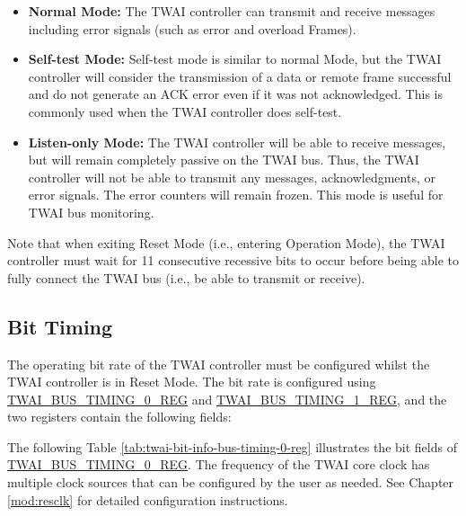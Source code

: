 \documentclass[main\_\_EN.tex]{subfiles}
\begin{document}
\begin{itemize}
    \item {\bfseries Normal Mode:} The TWAI controller can transmit and receive messages including error signals (such as error and overload Frames).
    \item {\bfseries Self-test Mode:} Self-test mode is similar to normal Mode, but the TWAI controller will consider the transmission of a data or remote frame successful and do not generate an ACK error even if it was not acknowledged. This is commonly used when the TWAI controller does self-test.
    \item {\bfseries Listen-only Mode:} The TWAI controller will be able to receive messages, but will remain completely passive on the TWAI bus. Thus, the TWAI controller will not be able to transmit any messages, acknowledgments, or error signals. The error counters will remain frozen. This mode is useful for TWAI bus monitoring.
\end{itemize}

Note that when exiting Reset Mode (i.e., entering Operation Mode), the TWAI controller must wait for 11 consecutive recessive bits to occur before being able to fully connect the TWAI bus (i.e., be able to transmit or receive).

\subsection{Bit Timing}
The operating bit rate of the TWAI controller must be configured whilst the TWAI controller is in Reset Mode. The bit rate is configured using \hyperref[regdesc:TWAIBUSTIMING0REG]{TWAI\_BUS\_TIMING\_0\_REG} and \hyperref[regdesc:TWAIBUSTIMING1REG]{TWAI\_BUS\_TIMING\_1\_REG}, and the two registers contain the following fields:

The following Table \ref{tab:twai-bit-info-bus-timing-0-reg} illustrates the bit fields of \hyperref[regdesc:TWAIBUSTIMING0REG]{TWAI\_BUS\_TIMING\_0\_REG}. The frequency of the TWAI core clock has multiple clock sources that can be configured by the user as needed. See Chapter \ref{mod:resclk} \textit{} for detailed configuration instructions.
\end{document}
